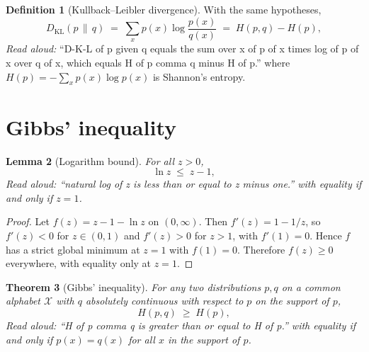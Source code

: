 \documentclass[11pt]{article}
\newtheorem{theorem}{Theorem}
\newtheorem{lemma}[theorem]{Lemma}
\theoremstyle{definition}
\newtheorem{definition}[theorem]{Definition}
\newcommand{\KL}{D_{\mathrm{KL}}}
\newcommand{\X}{\mathcal{X}}
\begin{document}
\begin{definition}[Kullback--Leibler divergence]
With the same hypotheses,
\[
  \KL(p \,\|\, q) \;=\; \sum_{x} p(x) \log \frac{p(x)}{q(x)} \;=\; H(p, q) - H(p),
\]
\emph{Read aloud:} ``D-K-L of p given q equals the sum over x of p of x times
log of p of x over q of x, which equals H of p comma q minus H of p.''
where $H(p) = -\sum_x p(x) \log p(x)$ is Shannon's entropy.
\end{definition}

\section{Gibbs' inequality}

\begin{lemma}[Logarithm bound]
\label{lem:logbound}
For all $z > 0$,
\[
  \ln z \;\le\; z - 1,
\]
\emph{Read aloud:} ``natural log of z is less than or equal to z minus one.''
with equality if and only if $z = 1$.
\end{lemma}

\begin{proof}
Let $f(z) = z - 1 - \ln z$ on $(0, \infty)$. Then $f'(z) = 1 - 1/z$, so $f'(z) < 0$
for $z \in (0, 1)$ and $f'(z) > 0$ for $z > 1$, with $f'(1) = 0$. Hence $f$ has a
strict global minimum at $z = 1$ with $f(1) = 0$. Therefore $f(z) \ge 0$
everywhere, with equality only at $z = 1$.
\end{proof}

\begin{theorem}[Gibbs' inequality]
\label{thm:gibbs}
For any two distributions $p, q$ on a common alphabet $\X$ with $q$ absolutely
continuous with respect to $p$ on the support of $p$,
\[
  H(p, q) \;\ge\; H(p),
\]
\emph{Read aloud:} ``H of p comma q is greater than or equal to H of p.''
with equality if and only if $p(x) = q(x)$ for all $x$ in the support of $p$.
\end{theorem}
\end{document}
